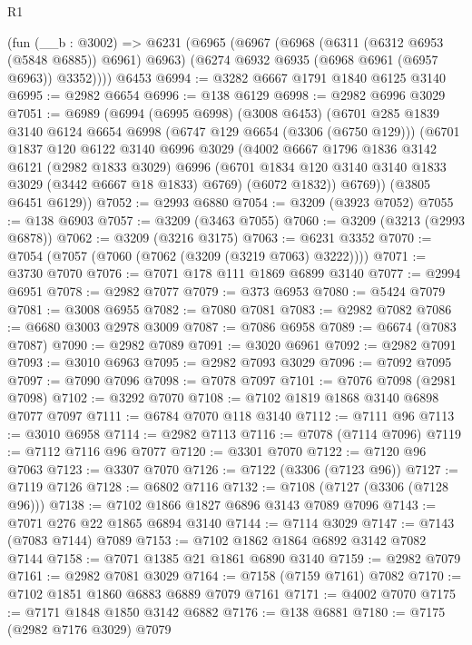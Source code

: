 \begin{lexlean}{R1}
\begin{coremodule}
    (fun (__b : @3002) =>
    @6231
      (@6965
        (@6967
          (@6968 (@6311 (@6312 @6953 (@5848 @6885)) @6961) @6963)
          (@6274 @6932 @6935 (@6968 @6961 (@6957 @6963)) @3352))))
    @6453
@6994 := @3282 @6667 @1791 @1840 @6125 @3140
@6995 := @2982 @6654
@6996 := @138 @6129
@6998 := @2982 @6996 @3029
@7051 := @6989
    (@6994
      (@6995 @6998)
      (@3008 @6453)
      (@6701
        @285
        @1839
        @3140
        @6124
        @6654
        @6998
        (@6747 @129 @6654 (@3306 (@6750 @129)))
        (@6701
          @1837
          @120
          @6122
          @3140
          @6996
          @3029
          (@4002
            @6667
            @1796
            @1836
            @3142
            @6121
            (@2982 @1833 @3029)
            @6996
            (@6701 @1834 @120 @3140 @3140 @1833 @3029 (@3442 @6667 @18 @1833) @6769)
            (@6072 @1832))
          @6769))
      (@3805 @6451 @6129))
@7052 := @2993 @6880
@7054 := @3209 (@3923 @7052)
@7055 := @138 @6903
@7057 := @3209 (@3463 @7055)
@7060 := @3209 (@3213 (@2993 @6878))
@7062 := @3209 (@3216 @3175)
@7063 := @6231 @3352
@7070 := @7054 (@7057 (@7060 (@7062 (@3209 (@3219 @7063) @3222))))
@7071 := @3730 @7070
@7076 := @7071 @178 @111 @1869 @6899 @3140
@7077 := @2994 @6951
@7078 := @2982 @7077
@7079 := @373 @6953
@7080 := @5424 @7079
@7081 := @3008 @6955
@7082 := @7080 @7081
@7083 := @2982 @7082
@7086 := @6680 @3003 @2978 @3009
@7087 := @7086 @6958
@7089 := @6674 (@7083 @7087)
@7090 := @2982 @7089
@7091 := @3020 @6961
@7092 := @2982 @7091
@7093 := @3010 @6963
@7095 := @2982 @7093 @3029
@7096 := @7092 @7095
@7097 := @7090 @7096
@7098 := @7078 @7097
@7101 := @7076 @7098 (@2981 @7098)
@7102 := @3292 @7070
@7108 := @7102 @1819 @1868 @3140 @6898 @7077 @7097
@7111 := @6784 @7070 @118 @3140
@7112 := @7111 @96
@7113 := @3010 @6958
@7114 := @2982 @7113
@7116 := @7078 (@7114 @7096)
@7119 := @7112 @7116 @96 @7077
@7120 := @3301 @7070
@7122 := @7120 @96 @7063
@7123 := @3307 @7070
@7126 := @7122 (@3306 (@7123 @96))
@7127 := @7119 @7126
@7128 := @6802 @7116
@7132 := @7108 (@7127 (@3306 (@7128 @96)))
@7138 := @7102 @1866 @1827 @6896 @3143 @7089 @7096
@7143 := @7071 @276 @22 @1865 @6894 @3140
@7144 := @7114 @3029
@7147 := @7143 (@7083 @7144) @7089
@7153 := @7102 @1862 @1864 @6892 @3142 @7082 @7144
@7158 := @7071 @1385 @21 @1861 @6890 @3140
@7159 := @2982 @7079
@7161 := @2982 @7081 @3029
@7164 := @7158 (@7159 @7161) @7082
@7170 := @7102 @1851 @1860 @6883 @6889 @7079 @7161
@7171 := @4002 @7070
@7175 := @7171 @1848 @1850 @3142 @6882
@7176 := @138 @6881
@7180 := @7175 (@2982 @7176 @3029) @7079

\end{coremodule}
\end{lexlean}

